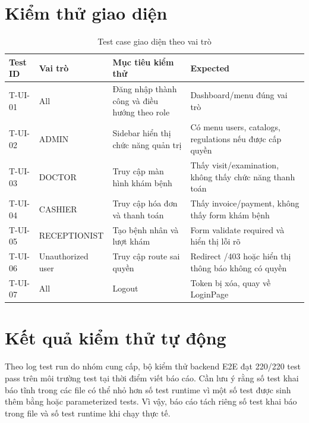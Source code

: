 \section{Kiểm thử giao diện}
\begin{longtable}{|p{2.4cm}|p{3.2cm}|p{5.2cm}|p{3.5cm}|}
\caption{Test case giao diện theo vai trò}\\
\hline
\textbf{Test ID} & \textbf{Vai trò} & \textbf{Mục tiêu kiểm thử} & \textbf{Expected} \\
\hline
T-UI-01 & All & Đăng nhập thành công và điều hướng theo role & Dashboard/menu đúng vai trò \\
\hline
T-UI-02 & ADMIN & Sidebar hiển thị chức năng quản trị & Có menu users, catalogs, regulations nếu được cấp quyền \\
\hline
T-UI-03 & DOCTOR & Truy cập màn hình khám bệnh & Thấy visit/examination, không thấy chức năng thanh toán \\
\hline
T-UI-04 & CASHIER & Truy cập hóa đơn và thanh toán & Thấy invoice/payment, không thấy form khám bệnh \\
\hline
T-UI-05 & RECEPTIONIST & Tạo bệnh nhân và lượt khám & Form validate required và hiển thị lỗi rõ \\
\hline
T-UI-06 & Unauthorized user & Truy cập route sai quyền & Redirect /403 hoặc hiển thị thông báo không có quyền \\
\hline
T-UI-07 & All & Logout & Token bị xóa, quay về LoginPage \\
\hline
\end{longtable}

\section{Kết quả kiểm thử tự động}

Theo log test run do nhóm cung cấp, bộ kiểm thử backend E2E đạt 220/220 test pass trên môi trường test tại thời điểm viết báo cáo. Cần lưu ý rằng số test khai báo tĩnh trong các file có thể nhỏ hơn số test runtime vì một số test được sinh thêm bằng  hoặc parameterized tests. Vì vậy, báo cáo tách riêng số test khai báo trong file và số test runtime khi chạy thực tế.

